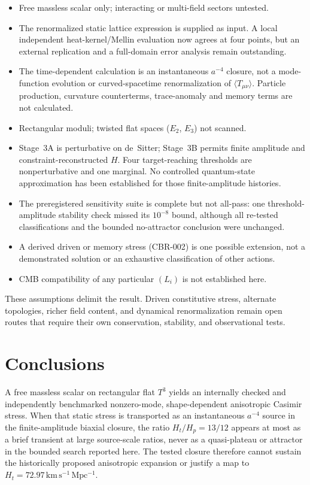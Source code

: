 \documentclass[aps,prd,reprint,superscriptaddress,nofootinbib,floatfix,showkeys]{revtex4-2}
\newcommand{\Tthree}{T^{3}}
\newcommand{\Ht}{H_{t}}
\newcommand{\Hp}{H_{p}}
\begin{document}
\begin{itemize}
\item Free massless scalar only; interacting or multi-field sectors untested.
\item The renormalized static lattice expression is supplied as input.  A local
independent heat-kernel/Mellin evaluation now agrees at four points, but an
external replication and a full-domain error analysis remain outstanding.
\item The time-dependent calculation is an instantaneous \(a^{-4}\) closure,
not a mode-function evolution or curved-spacetime renormalization of
\(\langle T_{\mu\nu}\rangle\).  Particle production, curvature counterterms,
trace-anomaly and memory terms are not calculated.
\item Rectangular moduli; twisted flat spaces (\(E_2\), \(E_3\)) not scanned.
\item Stage~3A is perturbative on de~Sitter; Stage~3B permits finite amplitude
and constraint-reconstructed \(H\). Four target-reaching thresholds are
nonperturbative and one marginal. No controlled quantum-state approximation
has been established for those finite-amplitude histories.
\item The preregistered sensitivity suite is complete but not all-pass: one
threshold-amplitude stability check missed its \(10^{-8}\) bound, although all
re-tested classifications and the bounded no-attractor conclusion were unchanged.
\item A derived driven or memory stress (CBR-002) is one possible extension,
not a demonstrated solution or an exhaustive classification of other actions.
\item CMB compatibility of any particular \((L_i)\) is not established here.
\end{itemize}

These assumptions delimit the result.  Driven constitutive stress, alternate
topologies, richer field content, and dynamical renormalization remain open
routes that require their own conservation, stability, and observational
tests.

\section{Conclusions}
\label{sec:concl}

A free massless scalar on rectangular flat \(\Tthree\) yields an internally
checked and independently benchmarked nonzero-mode, shape-dependent anisotropic
Casimir stress.
When that static stress is transported as an instantaneous \(a^{-4}\) source
in the finite-amplitude biaxial closure, the ratio \(\Ht/\Hp=13/12\) appears at most as
a brief transient at large source-scale ratios, never as a quasi-plateau or
attractor in the bounded search reported here.  The tested closure therefore
cannot sustain the historically proposed anisotropic expansion or justify a
map to
\(H_t=72.97\,\mathrm{km\,s^{-1}\,Mpc^{-1}}\).
\end{document}
